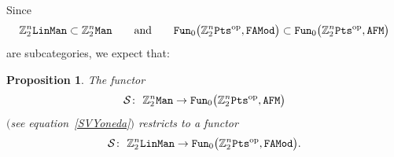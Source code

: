 \documentclass[pdftex]{sigma}%
\newcommand{\op}[1]{\operatorname{#1}}
\newcommand{\Z}{{\mathbb Z}}
\newcommand{\0}{\otimes}
\newcommand{\z}{\Z_2^n}
\numberwithin{equation}{section}
\newtheorem{Proposition}[Theorem]{Proposition}
 { \theoremstyle{definition}
\newtheorem{Definition}[Theorem]{Definition}
\newtheorem{Example}[Theorem]{Example}
\newtheorem{Remark}[Theorem]{Remark} }
\begin{document}
Since
\[
\z{\tt LinMan}\subset\z{\tt Man}\qquad\text{and}\qquad{\tt Fun}_0\big(\z{\tt Pts}^{\op{op}},{\tt FAMod}\big)\subset{\tt Fun}_0\big(\z{\tt Pts}^{\op{op}},{\tt AFM}\big)
\]
are subcategories, we expect that:

\begin{Proposition}
The functor
\begin{gather*}%
\mathcal{S}\colon\ \z{\tt Man}\to{\tt Fun}_0\big(\z{\tt Pts}^{\op{op}},\tt AFM\big)
\end{gather*}
$($see equation~\eqref{SVYoneda}$)$ restricts to a functor
\begin{gather*}
\mathcal{S}\colon\ \z{\tt LinMan}\to{\tt Fun}_0\big(\z{\tt Pts}^{\op{op}},\tt FAMod\big).
\end{gather*}
\end{Proposition}
\end{document}
